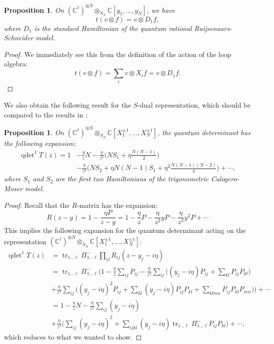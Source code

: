 \documentclass[11pt]{report}
\newtheorem{prop}[theorem]{Proposition}
\theoremstyle{definition}
\theoremstyle{remark}
\theoremstyle{remark}
\newcommand{\C}{\mathbb{C}}
\begin{document}
\begin{prop}
On $(\C^\ell)^{\otimes N} \otimes_{S_N} \C[y_1,...,y_N]$, we have
\begin{equation*}
t(v \otimes f) = v \otimes D_1 f,
\end{equation*}
where $D_1$ is the standard Hamiltonian of the quantum rational Ruijsenaars-Schneider model.
\end{prop}

\begin{proof}
We immediately see this from the definition of the action of the loop algebra:
\begin{equation*}
t(v \otimes f) = \sum_i v \otimes X_i f = v \otimes D_1 f.
\end{equation*}
\end{proof}

We also obtain the following result for the $S$-dual representation, which should be compared to the results in \cite{article:bernard:1993}:

\begin{prop}
On $(\C^\ell)^{\otimes N} \otimes_{S_N} \C[X_1^{\pm 1},...,X_N^{\pm 1}]$, the quantum determinant has the following expansion:
\begin{align*}
\operatorname{qdet}^1 T(z)
= 1 &- \frac{\eta}{z} N - \frac{\eta}{z^2} \bigg( N S_1 + \eta \frac{N(N-1)}{2} \bigg) \\
&- \frac{\eta}{z^3} \bigg( N S_2 + \eta N (N-1) S_1 + \eta^2 \frac{N(N-1)(N-2)}{4} \bigg) + \cdots,
\end{align*}
where $S_1$ and $S_2$ are the first two Hamiltonians of the trigonometric Calogero-Moser model.
\end{prop}

\begin{proof}
Recall that the $R$-matrix has the expansion:
\begin{equation*}
R(z-y) = 1 - \frac{\eta P}{z-y} = 1 - \frac{\eta}{z} P - \frac{\eta}{z^2} y P - \frac{\eta}{z^3} y^2 P + \cdots
\end{equation*}
This implies the following expansion for the quantum determinant acting on the representation $(\C^\ell)^{\otimes N} \otimes_{S_N} \C[X_1^{\pm 1},...,X_N^{\pm 1}]$:
\begin{align*}
\operatorname{qdet}^1 T(z)
&= \operatorname{tr}_{1...\ell} \Pi_{1...\ell}^- \prod_{ij} R_{ij}(z-y_j-i\eta) \\
&= \operatorname{tr}_{1...\ell} \Pi_{1...\ell}^- \bigg( 1
- \frac{\eta}{z} \sum_{ij} P_{ij}
- \frac{\eta}{z^2} \sum_{ij} \bigg( (y_j-i\eta) P_{ij} + \sum_{kl} P_{ij} P_{kl} \bigg) \\
&+ \frac{\eta}{z^3} \sum_{ij} \bigg( (y_j-i\eta)^2 P_{ij} + \sum_{kl} (y_j-i\eta) P_{ij} P_{kl} + \sum_{klmn} P_{ij} P_{kl} P_{mn} \bigg) \bigg) + \cdots \\
&= 1 - \frac{\eta}{z} N - \frac{\eta}{z^2} \sum_{ij} (y_j-i\eta) \\
&+ \frac{\eta}{z^3} \bigg( \sum_{ij} (y_j-i\eta)^2 + \sum_{ijkl} (y_j-i\eta) \operatorname{tr}_{1...\ell} \Pi_{1...\ell}^- P_{ij} P_{kl} \bigg) + \cdots,
\end{align*}
which reduces to what we wanted to show.
\end{proof}
\end{document}
